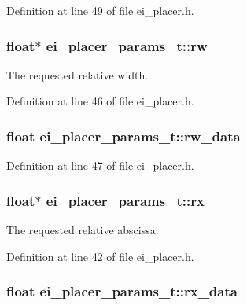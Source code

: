 Definition at line 49 of file ei\-\_\-placer.\-h.

\hypertarget{structei__placer__params__t_a9155d4067029e8c2a1f7a3f0af35036e}{
\subsubsection[{rw}]{\setlength{\rightskip}{0pt plus 5cm}float$\ast$ ei\-\_\-placer\-\_\-params\-\_\-t\-::rw}}\label{structei__placer__params__t_a9155d4067029e8c2a1f7a3f0af35036e}


The requested relative width. 



Definition at line 46 of file ei\-\_\-placer.\-h.

\hypertarget{structei__placer__params__t_a6541ed8c3c577fab040286a7d42b4595}{
\subsubsection[{rw\-\_\-data}]{\setlength{\rightskip}{0pt plus 5cm}float ei\-\_\-placer\-\_\-params\-\_\-t\-::rw\-\_\-data}}\label{structei__placer__params__t_a6541ed8c3c577fab040286a7d42b4595}


Definition at line 47 of file ei\-\_\-placer.\-h.

\hypertarget{structei__placer__params__t_a8570c9a80c6f3f0672a667c53348c698}{
\subsubsection[{rx}]{\setlength{\rightskip}{0pt plus 5cm}float$\ast$ ei\-\_\-placer\-\_\-params\-\_\-t\-::rx}}\label{structei__placer__params__t_a8570c9a80c6f3f0672a667c53348c698}


The requested relative abscissa. 



Definition at line 42 of file ei\-\_\-placer.\-h.

\hypertarget{structei__placer__params__t_a9155db861dc404336cc12888041ecc8d}{
\subsubsection[{rx\-\_\-data}]{\setlength{\rightskip}{0pt plus 5cm}float ei\-\_\-placer\-\_\-params\-\_\-t\-::rx\-\_\-data}}\label{structei__placer__params__t_a9155db861dc404336cc12888041ecc8d}


